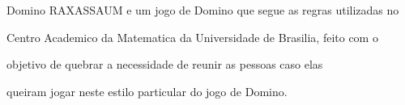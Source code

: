 Domino RAXASSAUM e um jogo de Domino que segue as regras utilizadas no \par
 Centro Academico da Matematica da Universidade de Brasilia, feito com o \par
 objetivo de quebrar a necessidade de reunir as pessoas caso elas \par
 queiram jogar neste estilo particular do jogo de Domino. 